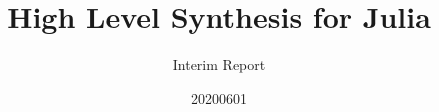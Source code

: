 \documentclass{report}[12]
\title{High Level Synthesis for Julia}
\author{Interim Report}
\date{20200601}
\begin{document}

\begin{titlepage}

\end{titlepage}







\pagebreak



\tableofcontents

\listoffigures

\lstlistoflistings

\pagebreak








\pagebreak








\appendix

\end{document}
